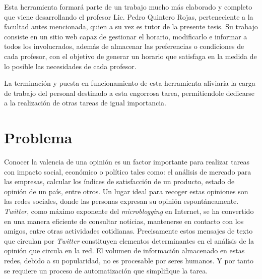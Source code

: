 \begin{introduction}
Esta herramienta formará parte de un trabajo mucho más elaborado y completo que viene desarrollando
el profesor Lic. Pedro Quintero Rojas, perteneciente a la facultad antes mencionada, quien a su vez
es tutor de la presente tesis. Su trabajo consiste en un sitio web capaz de gestionar el horario,
modificarlo e informar a todos los involucrados, además de almacenar las preferencias o condiciones
de cada profesor, con el objetivo de generar un horario que satisfaga en la medida de lo posible
las necesidades de cada profesor.

La terminación y puesta en funcionamiento de esta herramienta aliviaria la carga de trabajo del
personal destinado a esta engorrosa tarea, permitiendole dedicarse a la realización de otras
tareas de igual importancia.

\section*{Problema}

Conocer la valencia de una opinión es un factor importante para realizar tareas
con impacto social, económico o político tales como: el análisis de
mercado para las empresas, calcular los índices de sa\-tis\-fac\-ción de un producto,
estado de opinión de un país, entre otros.
Un lugar ideal para recoger estas opiniones son las redes sociales, donde las personas 
expresan su opinión espontáneamente. 
\emph{Twitter}, como máximo exponente del \emph{microblogging} en Internet, se ha
convertido en
una manera eficiente de consultar noticias, mantenerse en contacto con los
amigos, entre otras actividades cotidianas. Precisamente estos mensajes de
texto que circulan por \emph{Twitter} constituyen elementos determinantes en el
análisis de la opinión que circula en la red.
El volumen de información almacenado en
estas redes, debido a su popularidad, no es procesable por seres humanos.
Y por tanto se requiere un proceso de automatización que simplifique la tarea. 



\end{introduction}
